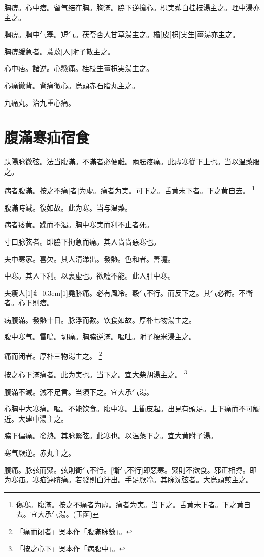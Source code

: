 \documentclass[oneside,b4paper]{ctexbook}
\begin{document}
\begin{flushleft}
胸痹。心中痞。留气结在胸。胸滿。脇下逆搶心。枳実薤白桂枝湯主之。理中湯亦主之。

胸痹。胸中气塞。短气。茯苓杏人甘草湯主之。橘[皮]枳[実生]薑湯亦主之。

胸痹缓急者。薏苡[人]附子散主之。

心中痞。諸逆。心懸痛。桂枝生薑枳実湯主之。

心痛徹背。背痛徹心。烏頭赤石脂丸主之。

九痛丸。治九重心痛。

\chapter{腹滿寒疝宿食}

趺陽脉微弦。法当腹滿。不滿者必便難。兩胠疼痛。此虛寒從下上也。当以温藥服之。

病者腹滿。按之不痛[者]为虛。痛者为実。可下之。舌黄未下者。下之黄自去。
\footnote{傷寒。腹滿。按之不痛者为虛。痛者为実。当下之。舌黄未下者。下之黄自去。宜大承气湯。(玉函)}

腹滿時減。復如故。此为寒。当与温藥。

病者痿黄。躁而不渴。胸中寒実而利不止者死。

寸口脉弦者。即脇下拘急而痛。其人啬啬惡寒也。

夫中寒家。喜欠。其人清涕出。發熱。色和者。善嚏。

中寒。其人下利。以裏虛也。欲嚏不能。此人肚中寒。

夫瘦人{\hbox{\scalebox{0.6}[1]{纟}\kern-0.3em\scalebox{0.63}[1]{堯}}}脐痛。必有風冷。穀气不行。而反下之。其气必衝。不衝者。心下則痞。

病腹滿。發熱十日。脉浮而數。饮食如故。厚朴七物湯主之。

腹中寒气。雷鳴。切痛。胸脇逆滿。嘔吐。附子粳米湯主之。

痛而闭者。厚朴三物湯主之。
\footnote{「痛而闭者」吳本作「腹滿脉數」。}

按之心下滿痛者。此为実也。当下之。宜大柴胡湯主之。
\footnote{「按之心下」吳本作「病腹中」。}

腹滿不減。減不足言。当須下之。宜大承气湯。

心胸中大寒痛。嘔。不能饮食。腹中寒。上衝皮起。出見有頭足。上下痛而不可觸近。大建中湯主之。

脇下偏痛。發熱。其脉緊弦。此寒也。以温藥下之。宜大黄附子湯。

寒气厥逆。赤丸主之。

腹痛。脉弦而緊。弦則衛气不行。[衛气不行]即惡寒。緊則不欲食。邪正相摶。即为寒疝。寒疝遶脐痛。若發則白汗出。手足厥冷。其脉沈弦者。大烏頭煎主之。


\end{flushleft}
\end{document}
